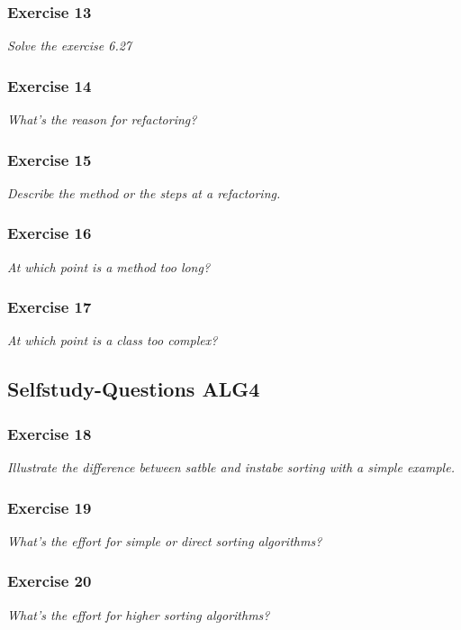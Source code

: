 \subsubsection*{Exercise 13}
\textit{Solve the exercise 6.27} \\

\subsubsection*{Exercise 14}
\textit{What's the reason for refactoring?} \\

\subsubsection*{Exercise 15}
\textit{Describe the method or the steps at a refactoring.} \\

\subsubsection*{Exercise 16}
\textit{At which point is a method too long?} \\

\subsubsection*{Exercise 17}
\textit{At which point is a class too complex?} \\


\subsection{Selfstudy-Questions ALG4}

\subsubsection*{Exercise 18}
\textit{Illustrate the difference between satble and instabe sorting with a 
simple example.} \\

\subsubsection*{Exercise 19}
\textit{What's the effort for simple or direct sorting algorithms?} \\

\subsubsection*{Exercise 20}
\textit{What's the effort for higher sorting algorithms?} \\

